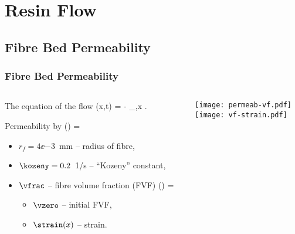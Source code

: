\documentclass[compress]{beamer}%
\newcommand{\eqcolor}{blue}
\newenvironment{myalign}
{\align\color{\eqcolor}}
{
  \nonumber
  \endalign
  \vspace{-1em}
}
\begin{document}
\section{Resin Flow}

\subsection{Fibre Bed Permeability}

\begin{frame}
  \frametitle{Fibre Bed Permeability}
  \begin{columns}
    \begin{column}{0.6\linewidth}
      The equation of the flow
      \begin{myalign}
        \flow(x,t) = - \press_{,x} .
      \end{myalign}
      Permeability by \citet{Dave1987b}
      \begin{myalign}
        \permeab(\vfrac) =   
      \end{myalign}
      \begin{itemize}
        \itemsep 0mm
      \item $r_f=4\ee{-3}$~mm -- radius of fibre,
      \item $\kozeny=0.2$~1/s -- ``Kozeny'' constant, 
      \item $\vfrac$ -- fibre volume fraction (FVF)
        \begin{myalign}
          \vfrac(\strain) = 
        \end{myalign}
        \begin{itemize}
        \item $\vzero$ -- initial FVF,
        \item $\strain(x)$ -- strain.
        \end{itemize}
      \end{itemize}
    \end{column}
    \begin{column}{0.4\linewidth}
      \texttt{[image: permeab-vf.pdf]}\\
      \texttt{[image: vf-strain.pdf]}
    \end{column}
  \end{columns}
  
\end{frame}
\end{document}
